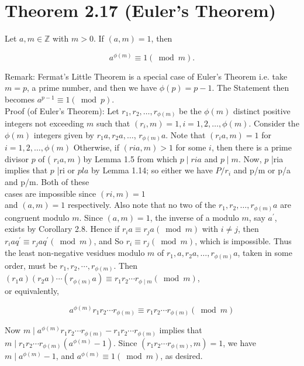 \documentclass[10pt]{article}
\begin{document}
\section*{Theorem 2.17 (Euler's Theorem)}
Let $a, m \in \mathbb{Z}$ with $m>0$. If $(a, m)=1$, then

$$
a^{\phi(m)} \equiv 1(\bmod m) .
$$

Remark: Fermat's Little Theorem is a special case of Euler's Theorem i.e. take $m=p$, a prime number, and then we have $\phi(p)=p-1$. The Statement then becomes $a^{p-1} \equiv 1(\bmod p)$.\\
Proof (of Euler's Theorem): Let $r_{1}, r_{2}, \ldots, r_{\phi(m)}$ be the $\phi(m)$ distinct positive integers not exceeding $m$ such that $\left(r_{i}, m\right)=1, i=1,2, \ldots, \phi(m)$. Consider the $\phi(m)$ integers given by $r_{1} a, r_{2} a, \ldots$, $r_{\phi(m)} a$. Note that $\left(r_{i} a, m\right)=1$ for $i=1,2, \ldots, \phi(m)$ Otherwise, if $(r i a, m)>1$ for some $i$, then there is a prime divisor $p$ of ( $r_{i} a, m$ ) by Lemma 1.5 from which $p \mid r i a$ and $p \mid m$. Now, $p$ |ria implies that $p$ |ri or $p l a$ by Lemma 1.14; so either we have $P / r_{i}$ and p/m or p/a and p/m. Both of these\\
cases are impossible since $(r i, m)=1$\\
and $(a, m)=1$ respectively. Also note that no two of the $r_{1}, r_{2}, \ldots, r_{\phi(m)} a$ are congruent modulo $m$. Since $(a, m)=1$, the inverse of a modulo $m$, say $a^{\prime}$, exists by Corollary 2.8. Hence if $r_{i} a \equiv r_{j} a(\bmod m)$ with $i \neq j$, then $r_{i} a q^{\prime} \equiv r_{j} a q^{\prime}(\bmod m)$, and So $r_{i} \equiv r_{j}(\bmod m)$, which is impossible. Thus the least non-negative vesidues modulo $m$ of $r_{1}, a, r_{2} a, \ldots, r_{\phi(m)} a$, taken in some order, must be $r_{1}, r_{2}, \cdots, r_{\phi(m)}$. Then\\
$\left(r_{1} a\right)\left(r_{2} a\right) \cdots\left(r_{\phi(m)} a\right) \equiv r_{1} r_{2} \cdots r_{\phi \mid m}(\bmod m)$,\\
or equivalently,

$$
a^{\phi(m)} r_{1} r_{2} \cdots r_{\phi(m)} \equiv r_{1} r_{2} \cdots r_{\phi(m)}(\bmod m)
$$

Now $m \mid a^{\phi(m)} r_{1} r_{2} \cdots r_{\phi(m)}-r_{1} r_{2} \cdots r_{\phi(m)}$ implies that $m \mid r_{1} r_{2} \cdots r_{\phi(m)}\left(a^{\phi(m)}-1\right)$. Since $\left(r_{1} r_{2} \cdots r_{\phi(m)}, m\right)=1$, we have $m \mid a^{\phi(m)}-1$, and $a^{\phi(m)} \equiv 1(\bmod m)$, as desired.
\end{document}
